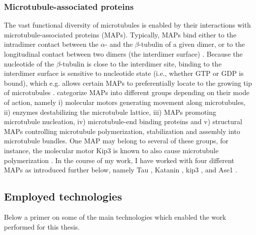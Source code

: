 \subsubsection{Microtubule-associated proteins}
\label{sec:MAPs}
The vast functional diversity of microtubules is enabled by their interactions with microtubule-associated proteins (MAPs). Typically, MAPs bind either to the intradimer contact between the $\alpha$- and the $\beta$-tubulin of a given dimer, or to the longitudinal contact between two dimers (the interdimer surface) . Because the nucleotide of the $\beta$-tubulin is close to the interdimer site, binding to the interdimer surface is sensitive to nucleotide state (i.e., whether GTP or GDP is bound), which e.g. allows certain MAPs to preferentially locate to the growing tip of microtubules . \cite{BODAKUNTLA2019804} categorize MAPs into different groups depending on their mode of action, namely i) molecular motors generating movement along microtubules, ii) enzymes destabilizing the microtubule lattice, iii) MAPs promoting microtubule nucleation, iv) microtubule-end binding proteins and v) structural MAPs controlling microtubule polymerization, stabilization and assembly into microtubule bundles. One MAP may belong to several of these groups, for instance, the molecular motor Kip3 is known to also cause microtubule polymerization \parencite{Gardner2011a}. In the course of my work, I have worked with four different MAPs as introduced further below, namely Tau , Katanin , kip3 , and Ase1 . 

\subsection{Employed technologies}
\label{sec:methods_intro}
Below a primer on some of the main technologies which enabled the work performed for this thesis.

